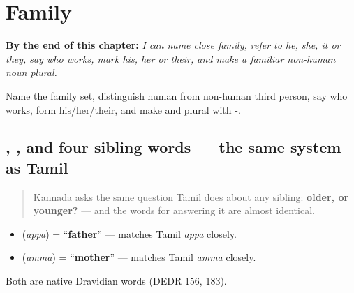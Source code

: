 
\chapter{Family}
\label{ch:ka-family}

\begin{chapteropening}
\textbf{By the end of this chapter:} \emph{I can name close family, refer to he, she, it or they, say who works, mark his, her or their, and make a familiar non-human noun plural.}

Name the family set, distinguish human from non-human third person, say who works, form his/her/their, and make  and  plural with -.
\end{chapteropening}

\section[\texorpdfstring{\kn{ಅಪ್ಪ} \kn{ಅಮ್ಮ} \kn{ಅಣ್ಣ} \kn{ತಮ್ಮ} … (appa amma aṇṇa …)}{ಅಪ್ಪ ಅಮ್ಮ ಅಣ್ಣ ತಮ್ಮ … (appa amma aṇṇa …)}]{, , and four sibling words — the same system as Tamil}

\label{lesson:KA-C12-kutumba}



\begin{quote}
Kannada asks the same question Tamil does about any sibling: \textbf{older, or younger?} — and the words for answering it are almost identical.
\end{quote}

\begin{cousinweb}
\begin{itemize}
\raggedright
  \item \textbf{} (\emph{appa}) = \textquotedblleft{}\textbf{father}\textquotedblright{} — matches Tamil \emph{appā} closely.
  \item \textbf{} (\emph{amma}) = \textquotedblleft{}\textbf{mother}\textquotedblright{} — matches Tamil \emph{ammā} closely.
\end{itemize}

Both are native Dravidian words (DEDR 156, 183).
\end{cousinweb}

